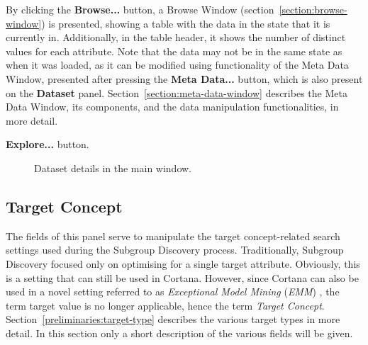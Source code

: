 \documentclass{article}
\begin{document}
By clicking the {\bf Browse...} button, a Browse Window (section~\ref{section:browse-window}) is presented, showing a table with the data in the state that it is currently in.
Additionally, in the table header, it shows the number of distinct values for each attribute.
Note that the data may not be in the same state as when it was loaded, as it can be modified using functionality of the Meta Data Window, presented after pressing the {\bf Meta Data...} button, which is also present on the {\bf Dataset} panel.
Section~\ref{section:meta-data-window} describes the Meta Data Window, its components, and the data manipulation functionalities, in more detail.

{\bf Explore...} button.

\begin{figure}
\begin{center}
\centering
{}
\caption{Dataset details in the main window.}
\end{center}
\label{fig:dataset}
\end{figure}





\subsection{Target Concept}
\label{main:target-concept}
The fields of this panel serve to manipulate the target concept-related search settings used during the Subgroup Discovery process.
Traditionally, Subgroup Discovery focused only on optimising for a single target attribute.
Obviously, this is a setting that can still be used in Cortana.
However, since Cortana can also be used in a novel setting referred to as \emph{Exceptional Model Mining} (\emph{EMM}) \cite{emm}, the term target value is no longer applicable, hence the term \emph{Target Concept}.
Section~\ref{preliminaries:target-type} describes the various target types in more detail.
In this section only a short description of the various fields will be given.
\end{document}
